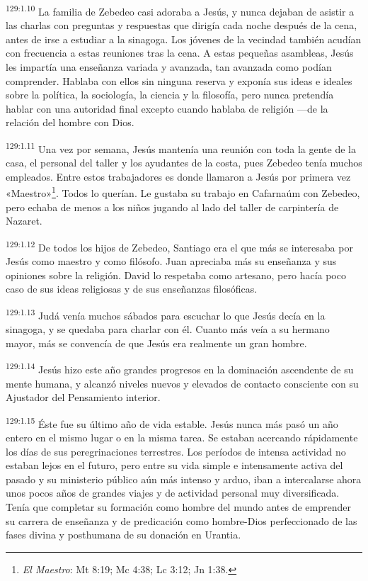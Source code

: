 \par
\textsuperscript{129:1.10} La familia de Zebedeo casi adoraba a Jesús, y nunca dejaban de asistir a las charlas con preguntas y respuestas que dirigía cada noche después de la cena, antes de irse a estudiar a la sinagoga. Los jóvenes de la vecindad también acudían con frecuencia a estas reuniones tras la cena. A estas pequeñas asambleas, Jesús les impartía una enseñanza variada y avanzada, tan avanzada como podían comprender. Hablaba con ellos sin ninguna reserva y exponía sus ideas e ideales sobre la política, la sociología, la ciencia y la filosofía, pero nunca pretendía hablar con una autoridad final excepto cuando hablaba de religión ---de la relación del hombre con Dios.

\par
\textsuperscript{129:1.11} Una vez por semana, Jesús mantenía una reunión con toda la gente de la casa, el personal del taller y los ayudantes de la costa, pues Zebedeo tenía muchos empleados. Entre estos trabajadores es donde llamaron a Jesús por primera vez «Maestro»\footnote{\textit{El Maestro}: Mt 8:19; Mc 4:38; Lc 3:12; Jn 1:38.}. Todos lo querían. Le gustaba su trabajo en Cafarnaúm con Zebedeo, pero echaba de menos a los niños jugando al lado del taller de carpintería de Nazaret.

\par
\textsuperscript{129:1.12} De todos los hijos de Zebedeo, Santiago era el que más se interesaba por Jesús como maestro y como filósofo. Juan apreciaba más su enseñanza y sus opiniones sobre la religión. David lo respetaba como artesano, pero hacía poco caso de sus ideas religiosas y de sus enseñanzas filosóficas.

\par
\textsuperscript{129:1.13} Judá venía muchos sábados para escuchar lo que Jesús decía en la sinagoga, y se quedaba para charlar con él. Cuanto más veía a su hermano mayor, más se convencía de que Jesús era realmente un gran hombre.

\par
\textsuperscript{129:1.14} Jesús hizo este año grandes progresos en la dominación ascendente de su mente humana, y alcanzó niveles nuevos y elevados de contacto consciente con su Ajustador del Pensamiento interior.

\par
\textsuperscript{129:1.15} Éste fue su último año de vida estable. Jesús nunca más pasó un año entero en el mismo lugar o en la misma tarea. Se estaban acercando rápidamente los días de sus peregrinaciones terrestres. Los períodos de intensa actividad no estaban lejos en el futuro, pero entre su vida simple e intensamente activa del pasado y su ministerio público aún más intenso y arduo, iban a intercalarse ahora unos pocos años de grandes viajes y de actividad personal muy diversificada. Tenía que completar su formación como hombre del mundo antes de emprender su carrera de enseñanza y de predicación como hombre-Dios perfeccionado de las fases divina y posthumana de su donación en Urantia.

